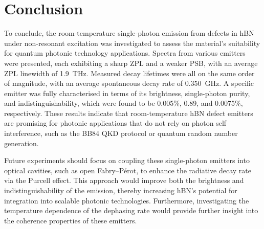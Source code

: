 \section{Conclusion}

To conclude, the room-temperature single-photon emission from defects in hBN under non-resonant excitation was investigated to assess the material's suitability for quantum photonic technology applications. Spectra from various emitters were presented, each exhibiting a sharp ZPL and a weaker PSB, with an average ZPL linewidth of 1.9~THz. Measured decay lifetimes were all on the same order of magnitude, with an average spontaneous decay rate of 0.350~GHz. A specific emitter was fully characterised in terms of its brightness, single-photon purity, and indistinguishability, which were found to be 0.005\%, 0.89, and 0.0075\%, respectively. These results indicate that room-temperature hBN defect emitters are promising for photonic applications that do not rely on photon self interference, such as the BB84 QKD protocol or quantum random number generation.

Future experiments should focus on coupling these single-photon emitters into optical cavities, such as open Fabry–Pérot, to enhance the radiative decay rate via the Purcell effect. This approach would improve both the brightness and indistinguishability of the emission, thereby increasing hBN’s potential for integration into scalable photonic technologies. Furthermore, investigating the temperature dependence of the dephasing rate would provide further insight into the coherence properties of these emitters.
